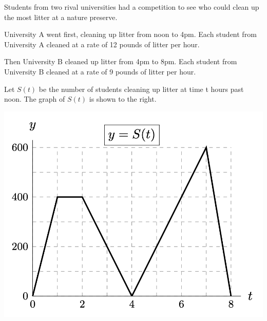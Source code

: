 \documentclass[11pt]{exam}
\begin{document}
\begin{questions}
  \begin{minipage}{0.5\linewidth}
    Students from two rival universities had a competition to see who
    could clean up the most litter at a nature preserve.

    University A went first, cleaning up litter from noon to 4pm. Each
    student from University A cleaned at a rate of 12 pounds of litter
    per hour.

    
    Then University B cleaned up litter from 4pm to 8pm.  Each student
    from University B cleaned at a rate of 9 pounds of litter per
    hour.

    Let \(S(t)\) be the number of students cleaning up litter at time
    t hours past noon. The graph of \(S(t)\) is shown to the right.
  \end{minipage}
  \begin{minipage}{0.5\linewidth}
    \includegraphics[scale=0.5]{graph_w19}
  \end{minipage}
\end{questions}
\end{document}
